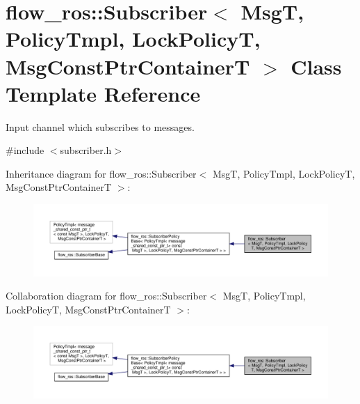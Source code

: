 \hypertarget{classflow__ros_1_1_subscriber}{}\section{flow\+\_\+ros\+:\+:Subscriber$<$ MsgT, Policy\+Tmpl, Lock\+PolicyT, Msg\+Const\+Ptr\+ContainerT $>$ Class Template Reference}
\label{classflow__ros_1_1_subscriber}


Input channel which subscribes to messages.  




{\ttfamily \#include $<$subscriber.\+h$>$}



Inheritance diagram for flow\+\_\+ros\+:\+:Subscriber$<$ MsgT, Policy\+Tmpl, Lock\+PolicyT, Msg\+Const\+Ptr\+ContainerT $>$\+:\nopagebreak
\begin{figure}[H]
\begin{center}
\leavevmode
\includegraphics[width=350pt]{classflow__ros_1_1_subscriber__inherit__graph}
\end{center}
\end{figure}


Collaboration diagram for flow\+\_\+ros\+:\+:Subscriber$<$ MsgT, Policy\+Tmpl, Lock\+PolicyT, Msg\+Const\+Ptr\+ContainerT $>$\+:\nopagebreak
\begin{figure}[H]
\begin{center}
\leavevmode
\includegraphics[width=350pt]{classflow__ros_1_1_subscriber__coll__graph}
\end{center}
\end{figure}
